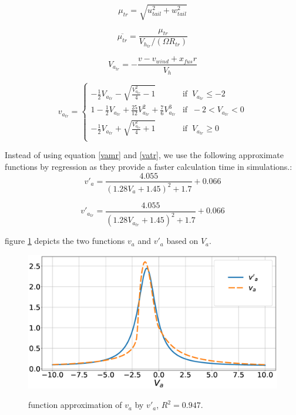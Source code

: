 \begin{equation}
	\mu_{tr}=\sqrt{u_{tail}^2+w_{tail}^2} 
\end{equation}

\begin{equation}
	\overline{\mu_{tr}}=\frac{\mu_{tr}}{V_{h_{tr}}/(\Omega R_{tr})} 
\end{equation}

\begin{equation}
	V_{a_{tr}}=-\frac{v-v_{wind}+x_{fus}r}{V_h}
\end{equation}

\begin{equation}
	v_{a_{tr}} = \left\{
	\begin{array}{ll}
		-\frac{1}{2} V_{a_{tr}}-\sqrt{\frac{V_{a_{tr}}^2}{4}-1} & \mbox{if } \ V_{a_{tr}} 	\leqslant -2 \\
		1-\frac{1}{2} V_{a_{tr}}+\frac{25}{12} V_{a_{tr}}^2 +\frac{7}{6} V_{a_{tr}}^3 & \mbox{if } \ -2<V_{a_{tr}}<0 \\
		-\frac{1}{2} V_{a_{tr}}+\sqrt{\frac{V_{a_{tr}}^2}{4}+1} & \mbox{if } \ V_{a_{tr}}	\geqslant 0 \\
	\end{array}
	\right.
	\label{vatr}
\end{equation}

Instead of using equation \ref{vamr} and \ref{vatr}, we use the following approximate functions by regression as they provide a faster calculation time in simulations.:
\begin{equation}
	v'_a = \frac{4.055}{{\left(1.28V_{a}+1.45\right)}^2+1.7}+0.066
\end{equation}

\begin{equation}
	v'_{a_{tr}} = \frac{4.055}{{\left(1.28V_{a_{tr}}+1.45\right)}^2+1.7}+0.066
\end{equation}

figure \ref{fig_va} depicts the two functions $v_a$ and $v'_a$ based on $V_a$.

\begin{figure}
	\begin{center}
		{\includegraphics[scale=0.3]{va.eps}}
		
		\caption{function approximation of $v_a$ by $v'_a$, $R^2=0.947$.}
		\label{fig_va}
	\end{center}
\end{figure}
